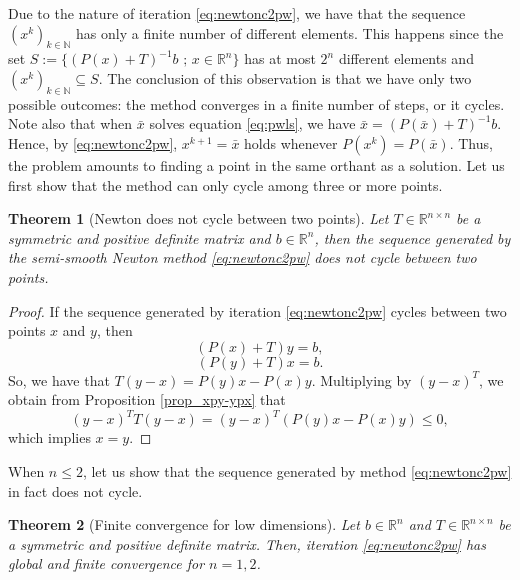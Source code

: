 \documentclass[11pt]{article}
\newtheorem{theorem}{Theorem}[section]
\newcommand{\R}{\mathbb R}
\newcommand{\NN}{\mathbb{N}}
\begin{document}
Due to the nature of iteration \eqref{eq:newtonc2pw}, we have that the sequence $(x^{k})_{k\in\NN}$ has only a finite number of different elements. This happens since the set $S := \{(P(x)+T)^{-1}b \text{ ; } x \in \R^n\}$ has at most $2^n$ different elements and $(x^{k})_{k\in\NN} \subseteq S$. The conclusion of this observation is that we have only two possible outcomes: the method converges in a finite number of steps, or it cycles. Note also that when $\bar{x}$ solves equation \eqref{eq:pwls}, we have $\bar{x}=(P(\bar{x})+T)^{-1}b$. Hence, by \eqref{eq:newtonc2pw}, $x^{k+1}=\bar{x}$ holds whenever $P(x^{k})=P(\bar{x})$. Thus, the problem amounts to finding a point in the same orthant as a solution. Let us first show that the method can only cycle among three or more points.

\begin{theorem} [Newton does not cycle between two points] \label{no-cycles-with-two-elements} Let $T\in\R^{n\times n}$ be a symmetric and positive definite matrix and $b\in\R^n$, then  
the sequence generated by the semi-smooth Newton method \eqref{eq:newtonc2pw} does not cycle between two points.
\end{theorem}
\begin{proof}
If the sequence generated by iteration \eqref{eq:newtonc2pw} cycles between two points $x$ and $y$, then 
$$ (P(x)+T)y = b,$$
$$ (P(y)+T)x = b.$$ So, we have that $T(y-x) = P(y)x-P(x)y$. Multiplying by $(y-x)^T$, we obtain from Proposition \ref{prop_xpy-ypx} that
$$ (y-x)^T T(y-x) = (y-x)^T(P(y)x-P(x)y) \leq 0,$$ which implies $x=y$.
\end{proof}

When $n\leq2$, let us show that the sequence generated by method \eqref{eq:newtonc2pw} in fact does not cycle.

\begin{theorem}[Finite convergence for low dimensions] \label{teo_finite_conv}
Let $b \in \R^n$ and $T\in\R^{n\times n}$ be a symmetric and positive definite matrix. Then, iteration \eqref{eq:newtonc2pw} has global and finite convergence for $n=1,2$.
\end{theorem}
\end{document}
